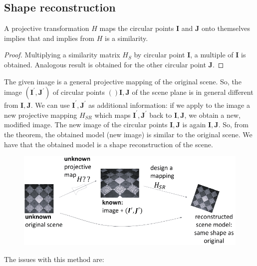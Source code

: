 \documentclass[12pt, a4paper]{report}
\newtheorem[style=M,bodystyle=\normalfont]{theorem}{Theorem}
\newtheorem[style=M,bodystyle=\normalfont]{corollary}{Corollary}
\newtheorem[style=M,bodystyle=\normalfont]{lemma}{Lemma}
\newtheorem[style=M,bodystyle=\normalfont]{definition}{Definition}
\begin{document}
    \subsection{Shape reconstruction}
    \begin{theorem}
        A projective transformation $H$ maps the circular points $\boldsymbol{I}$ and $\boldsymbol{J}$ onto themselves implies that and 
        implies from $H$ is a similarity. 
    \end{theorem}
    \begin{proof}
        Multiplying a similarity matrix $H_S$ by circular point $\boldsymbol{I}$, a multiple of $\boldsymbol{I}$ is obtained. Analogous 
        result is obtained for the other circular point $\boldsymbol{J}$. 
    \end{proof}
    The given image is a general projective mapping of the original scene. So, the image $(\boldsymbol{I}^{'},\boldsymbol{J}^{'})$ of 
    circular points $()\boldsymbol{I},\boldsymbol{J}$ of the scene plane is in general different from $\boldsymbol{I},\boldsymbol{J}$.
    We can use $\boldsymbol{I}^{'},\boldsymbol{J}^{'}$ as additional information: if we apply to the image a new projective
    mapping $H_{SR}$ which maps $\boldsymbol{I}^{'},\boldsymbol{J}^{'}$ back to $\boldsymbol{I},\boldsymbol{J}$, we obtain a new, 
    modified image. The new image of the circular points $\boldsymbol{I},\boldsymbol{J}$ is again $\boldsymbol{I},\boldsymbol{J}$. 
    So, from the theorem, the obtained model (new image) is similar to the original scene. We have that the obtained model is a shape 
    reconstruction of the scene. 
    \begin{figure}[H]
        \centering
        \includegraphics[width=0.75\linewidth]{images/HSR.png}
    \end{figure}
    The issues with this method are: 
\end{document}
